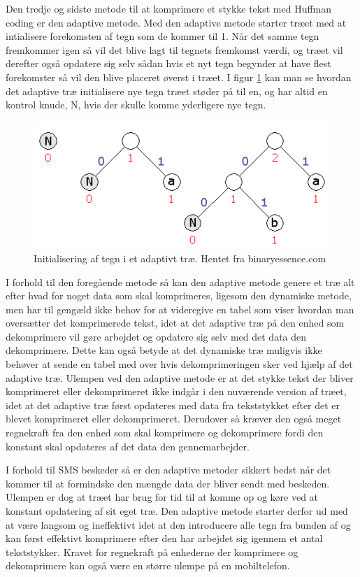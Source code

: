 Den tredje og sidste metode til at komprimere et stykke tekst med Huffman coding er den adaptive metode. Med den adaptive metode starter træet med at intialisere forekomsten af tegn som de kommer til 1. Når det samme tegn fremkommer igen så vil det blive lagt til tegnets fremkomst værdi, og træet vil derefter også opdatere sig selv sådan hvis et nyt tegn begynder at have flest forekomster så vil den blive placeret øverst i træet. I figur \ref{fig:adaptive_tree} kan man se hvordan det adaptive træ initialisere nye tegn træet støder på til en, og har altid en kontrol knude, N, hvis der skulle komme yderligere nye tegn.

\begin{figure}[H]
\centering
\includegraphics[width=\linewidth]{Billeder/adaptivt.png}
\caption{Initialisering af tegn i et adaptivt træ. Hentet fra binaryessence.com\cite{Hufftree_1}}
\label{fig:adaptive_tree}
\end{figure}

I forhold til den foregående metode så kan den adaptive metode genere et træ alt efter hvad for noget data som skal komprimeres, ligesom den dynamiske metode, men har til gengæld ikke behov for at videregive en tabel som viser hvordan man oversætter det komprimerede tekst, idet at det adaptive træ på den enhed som dekomprimere vil gøre arbejdet og opdatere sig selv med det data den dekomprimere. Dette kan også betyde at det dynamiske træ muligvis ikke behøver at sende en tabel med over hvis dekomprimeringen sker ved hjælp af det adaptive træ. Ulempen ved den adaptive metode er at det stykke tekst der bliver komprimeret eller dekomprimeret ikke indgår i den nuværende version af træet, idet at det adaptive træ først opdateres med data fra tekststykket efter det er blevet komprimeret eller dekomprimeret. Derudover så kræver den også meget regnekraft fra den enhed som skal komprimere og dekomprimere fordi den konstant skal opdateres af det data den gennemarbejder. \cite{Hufftree_5}

I forhold til SMS beskeder så er den adaptive metoder sikkert bedst når det kommer til at formindske den mængde data der bliver sendt med beskeden. Ulempen er dog at træet har brug for tid til at komme op og køre ved at konstant opdatering af sit eget træ. Den adaptive metode starter derfor ud med at være langsom og ineffektivt idet at den introducere alle tegn fra bunden af og kan først effektivt komprimere efter den har arbejdet sig igennem et antal tekststykker. Kravet for regnekraft på enhederne der komprimere og dekomprimere kan også være en større ulempe på en mobiltelefon.
